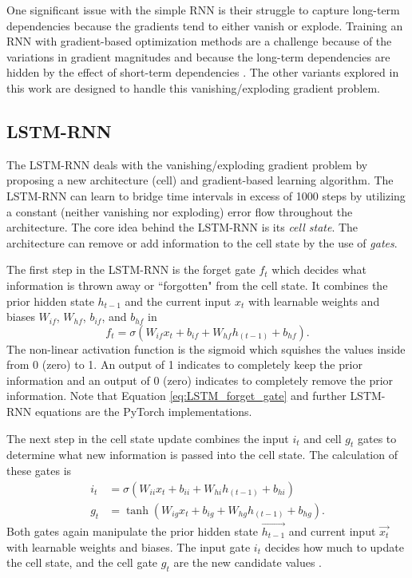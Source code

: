 One significant issue with the simple \ac{RNN} is their struggle to capture long-term dependencies because the gradients tend to either vanish or explode. Training an \ac{RNN} with gradient-based optimization methods are a challenge because of the variations in gradient magnitudes and because the long-term dependencies are hidden by the effect of short-term dependencies \cite{GRU}. The other variants explored in this work are designed to handle this vanishing/exploding gradient problem.

\subsection{LSTM-RNN}
The \ac{LSTM-RNN} \cite{LSTM} deals with the vanishing/exploding gradient problem by proposing a new architecture (cell) and gradient-based learning algorithm. The \ac{LSTM-RNN} can learn to bridge time intervals in excess of 1000 steps by utilizing a constant (neither vanishing nor exploding) error flow throughout the architecture. The core idea behind the \ac{LSTM-RNN} is its \emph{cell state}. The architecture can remove or add information to the cell state by the use of \emph{gates}.

The first step in the \ac{LSTM-RNN} is the forget gate $f_{t}$ which decides what information is thrown away or ``forgotten" from the cell state. It combines the prior hidden state $h_{t-1}$ and the current input $x_{t}$ with learnable weights and biases $W_{if}$, $W_{hf}$, $b_{if}$, and $b_{hf}$ in
\begin{equation} \label{eq:LSTM_forget_gate}
	f_{t} = \sigma\left(W_{if}x_{t} + b_{if} + W_{hf}h_{\left(t-1\right)} + b_{hf}\right).
\end{equation}
The non-linear activation function is the sigmoid which squishes the values inside from 0 (zero) to 1. An output of 1 indicates to completely keep the prior information and an output of 0 (zero) indicates to completely remove the prior information. Note that Equation \ref{eq:LSTM_forget_gate} and further \ac{LSTM-RNN} equations are the PyTorch \cite{PyTorch} implementations.

The next step in the cell state update combines the input $i_{t}$ and cell $g_{t}$ gates to determine what new information is passed into the cell state. The calculation of these gates is 
\begin{align}
i_{t} &= \sigma\left(W_{ii}x_{t} + b_{ii} + W_{hi}h_{\left(t-1\right)} + b_{hi}\right) \label{eq:LSTM_input_gate} \\
g_{t} &= \tanh\left(W_{ig}x_{t} + b_{ig} + W_{hg}h_{\left(t-1\right)} + b_{hg}\right). \label{eq:LSTM_cell_gate}
\end{align}
Both gates again manipulate the prior hidden state $\vec{h_{t-1}}$ and current input $\vec{x_{t}}$ with learnable weights and biases. The input gate $i_{t}$ decides how much to update the cell state, and the cell gate $g_{t}$ are the new candidate values \cite{olah}.

